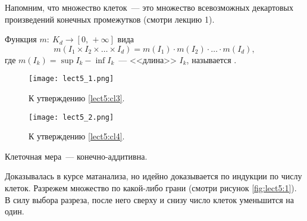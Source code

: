 Напомним, что множество клеток~--- это множество всевозможных декартовых произведений конечных промежутков (смотри лекцию 1).

\begin{definition}
    Функция $m:\ K_d\rightarrow[0,\,+\infty]$ вида
    \[
        m(I_1\times I_2\times\ldots\times I_d) = m(I_1)\cdot m(I_2)\cdot\ldots\cdot m(I_d),
    \]
    где $m(I_k)=\sup I_k-\inf I_k$~--- <<длина>> $I_k$, называется .
\end{definition}

\begin{figure}
    \centering
    \begin{minipage}{.4\textwidth}
        \centering
        \texttt{[image: lect5\_1.png]}
        \caption{К утверждению \ref{lect5:cl3}.}
        \label{fig:lect5:1}
    \end{minipage}%
    \begin{minipage}{.6\textwidth}
        \centering
        \texttt{[image: lect5\_2.png]}
        \caption{К утверждению \ref{lect5:cl4}.}
        \label{fig:lect5:2}
    \end{minipage}
\end{figure}

\begin{claim}
    \label{lect5:cl3}
    Клеточная мера~--- конечно-аддитивна.

    \begin{remark}
        Доказывалась в курсе матанализа, но идейно доказывается по индукции по числу клеток.
        Разрежем множество по какой-либо грани (смотри рисунок \ref{fig:lect5:1}). В силу выбора разреза, после него сверху и снизу число клеток
        уменьшится на один.
    \end{remark}
\end{claim}

